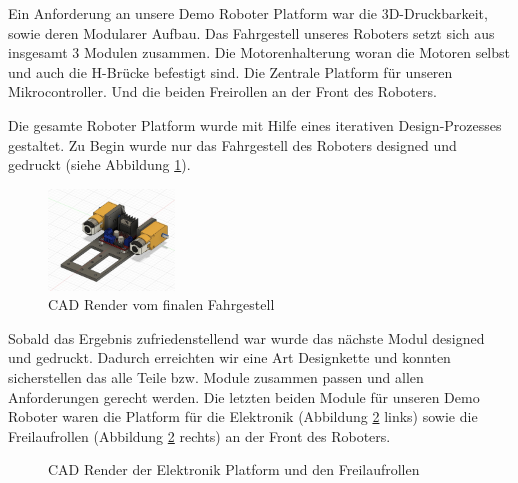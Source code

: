 \begin{flushleft}
    Ein Anforderung an unsere Demo Roboter Platform war die 3D-Druckbarkeit, sowie deren Modularer Aufbau.
    Das Fahrgestell unseres Roboters setzt sich aus insgesamt 3 Modulen zusammen.
    Die Motorenhalterung woran die Motoren selbst und auch die H-Brücke befestigt sind.
    Die Zentrale Platform für unseren Mikrocontroller.
    Und die beiden Freirollen an der Front des Roboters.

    Die gesamte Roboter Platform wurde mit Hilfe eines iterativen Design-Prozesses gestaltet. 
    Zu Begin wurde nur das Fahrgestell des Roboters designed und gedruckt (siehe Abbildung \ref{fig:cad_fahrgestell}).

    \begin{figure}[h!]
        \centering
        \includegraphics[width=0.3\textwidth]{imgs/Roboter/CAD/Fahrgestell.jpg}
        \caption{CAD Render vom finalen Fahrgestell}
        \label{fig:cad_fahrgestell}%
    \end{figure}

    Sobald das Ergebnis zufriedenstellend war wurde das nächste Modul designed und gedruckt.
    Dadurch erreichten wir eine Art Designkette und konnten sicherstellen das alle Teile bzw. Module zusammen passen
    und allen Anforderungen gerecht werden.
    Die letzten beiden Module für unseren Demo Roboter waren die Platform für die Elektronik (Abbildung \ref{fig:example} links) sowie die Freilaufrollen (Abbildung \ref{fig:example} rechts)
    an der Front des Roboters.

    \begin{figure}[h!]
        \centering
        \qquad
        \caption{CAD Render der Elektronik Platform und den Freilaufrollen}%
        \label{fig:example}%
    \end{figure}
\end{flushleft}
